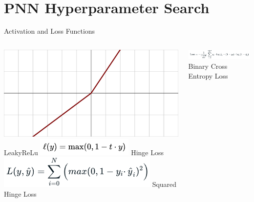 \documentclass[aspectratio=169,xcolor=table]{beamer}
\begin{document}
  \section{PNN Hyperparameter Search}

    \begin{frame}{Activation and Loss Functions}
      \begin{columns}
      \includegraphics[height=.3\textwidth,keepaspectratio=true]{Activation_prelu.svg.png}
      LeakyReLu
      \includegraphics[height=.2\textwidth,keepaspectratio=true]{Hinge_LossFunction.png}
      Hinge Loss 
      \includegraphics[height=.2\textwidth,keepaspectratio=true]{Hinge_Squared_lossFunction.png}
      Squared Hinge Loss

      \includegraphics[height=.17\textwidth,keepaspectratio=true]{Binary_Crossentropy_LossFunction.png}
      Binary Cross Entropy Loss

      \end{columns}
    \end{frame}
\end{document}

